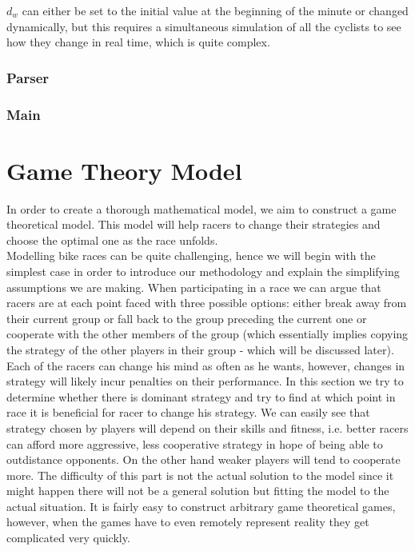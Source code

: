 \documentclass[10pt, a4paper]{report}
\begin{document}
$d_w$ can either be set to the initial value at the beginning of the minute or changed dynamically, but this requires a simultaneous simulation of all the cyclists to see how they change in real time, which is quite complex.

\subsubsection{Parser}

\subsubsection{Main}


\section{Game Theory Model}\label{sec:gameth}

In order to create a thorough mathematical model, we aim to construct a game theoretical model. This model will help racers to change their strategies and choose the optimal one as the race unfolds.\\

Modelling bike races can be quite challenging, hence we will begin with the simplest case in order to introduce our methodology and explain the simplifying assumptions we are making. When participating in a race we can argue that racers are at each point faced with three possible options: either break away from their current group or fall back to the group preceding the current one or cooperate with the other members of the group (which essentially implies copying the strategy of the other players in their group - which will be discussed later). Each of the racers can change his mind as often as he wants, however, changes in strategy will likely incur penalties on their performance. In this section we try to determine whether there is dominant strategy and try to find at which point in race it is beneficial for racer to change his strategy. We can easily see that strategy chosen by players will depend on their skills and fitness, i.e. better racers can afford more aggressive, less cooperative strategy in hope of being able to outdistance opponents. On the other hand weaker players will tend to cooperate more. The difficulty of this part is not the actual solution to the model since it might happen there will not be a general solution but fitting the model to the actual situation. It is fairly easy to construct arbitrary game theoretical games, however, when the games have to even remotely represent reality they get complicated very quickly.\\
\end{document}
